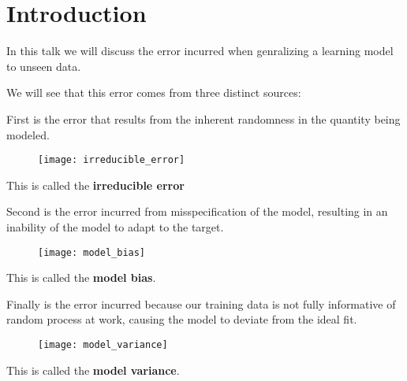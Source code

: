 \section{Introduction}
%
%
\begin{frame}
  In this talk we will discuss the error incurred when genralizing a learning
  model to unseen data.
\end{frame}
%
%
\begin{frame}
  We will see that this error comes from three distinct sources:
\end{frame}
%
%
\begin{frame}
  First is the error that results from the inherent randomness in the quantity
  being modeled.

  \begin{figure}
    \texttt{[image: irreducible\_error]}
  \end{figure}

  This is called the \textbf{irreducible error}
\end{frame}
%
%
\begin{frame}
  Second is the error incurred from misspecification of the model, resulting in
  an inability of the model to adapt to the target.

  \begin{figure}
    \texttt{[image: model\_bias]}
  \end{figure}

  This is called the \textbf{model bias}.
\end{frame}
%
%
\begin{frame}
  Finally is the error incurred because our training data is not fully
  informative of random process at work, causing the model to deviate from the
  ideal fit.

  \begin{figure}
    \texttt{[image: model\_variance]}
  \end{figure}

  This is called the \textbf{model variance}.
\end{frame}
